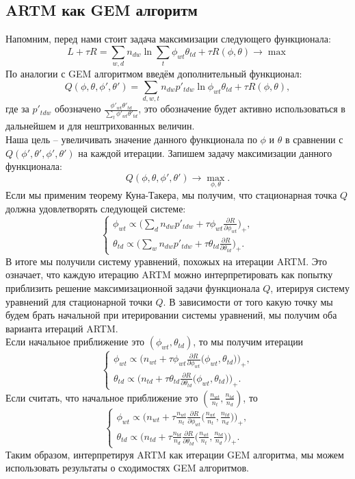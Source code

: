 \documentclass[12pt]{article}
\begin{document}
	\subsection{ARTM как GEM алгоритм}
	Напомним,  перед нами стоит задача максимизации следующего функционала:
\[
L + \tau R = \sum_{w,d} n_{dw} \ln\sum_t \phi_{wt} \theta_{td} + \tau R(\phi, \theta) \to \max
\]
По аналогии с GEM алгоритмом введём дополнительный функционал:
\[
	Q(\phi, \theta, \phi', \theta') = \sum\limits_{d, w, t} n_{dw} p'_{tdw} \ln{\phi_{wt}\theta_{td}} + \tau R(\phi, \theta),
\]
где за $p'_{tdw}$ обозначено $\frac{\phi'_{wt} \theta'_{td}}{\sum\limits_t \phi'_{wt} \theta'_{td}}$, это обозначение будет активно использоваться в дальнейшем и для нештрихованных величин. \\
Наша цель -- увеличивать значение данного функционала по $\phi$ и $\theta$ в сравнении с $Q(\phi', \theta', \phi', \theta')$ на каждой итерации. Запишем задачу максимизации данного функционала:
\[
Q(\phi, \theta, \phi', \theta') \to \max_{\phi, \theta}.
\]
Если мы применим теорему Куна-Такера, мы получим, что стационарная точка $Q$ должна удовлетворять следующей системе:
\[
\left\{
	\begin{aligned}
		\phi_{wt} \propto \bigg( \sum\limits_d n_{dw} p'_{tdw} + \tau\phi_{wt} \frac{\partial{R}}{\partial{\phi_{wt}}} \bigg)_{+},\\
		\theta_{td} \propto \bigg( \sum\limits_w n_{dw} p'_{tdw} + \tau\theta_{td} \frac{\partial{R}}{\partial{\theta_{td}}} \bigg)_{+}.
	\end{aligned}
\right.
\]
В итоге мы получили систему уравнений, похожых на итерации ARTM. Это означает, что каждую итерацию ARTM можно интерпретировать как попытку приблизить решение максимизационной задачи функционала $Q$, итерируя систему уравнений для стационарной точки $Q$. В зависимости от того какую точку мы будем брать начальной при итерировании системы уравнений, мы получим оба варианта итераций ARTM.\\
Если начальное приближение это $(\phi_{wt}, \theta_{td})$, то мы получим итерации
\[
\left\{
	\begin{aligned}
		\phi_{wt} \propto \bigg( n_{wt} + \tau\phi_{wt} \frac{\partial{R}}{\partial{\phi_{wt}}} \big( \phi_{wt}, \theta_{td}\big) \bigg)_{+},\\
		\theta_{td} \propto \bigg( n_{td} + \tau\theta_{td} \frac{\partial{R}}{\partial{\theta_{td}}} \big( \phi_{wt}, \theta_{td}\big) \bigg)_{+}.
	\end{aligned}
\right.
\]
Если считать, что начальное приближение это $(\frac{n_{wt}}{n_t}, \frac{n_{td}}{n_d})$, то
\[
\left\{
	\begin{aligned}
		\phi_{wt} \propto \bigg( n_{wt} + \tau \frac{n_{wt}}{n_t} \frac{\partial{R}}{\partial{\phi_{wt}}} \big(\frac{n_{wt}}{n_t}, \frac{n_{td}}{n_d}\big) \bigg)_{+},\\
		\theta_{td} \propto \bigg(n_{td} + \tau \frac{n_{td}}{n_d} \frac{\partial{R}}{\partial{\theta_{td}}} \big(\frac{n_{wt}}{n_t}, \frac{n_{td}}{n_d}\big) \bigg)_{+}.
	\end{aligned}
\right.
\]
Таким образом, интерпретируя ARTM как итерации GEM алгоритма, мы можем использовать результаты о сходимостях GEM алгоритмов.
\end{document}
